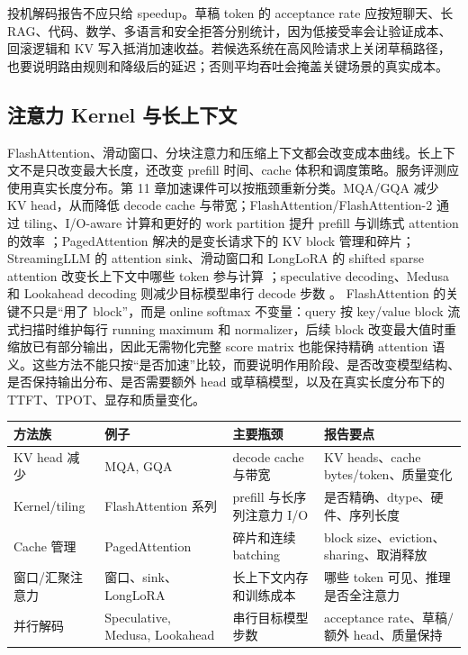 \documentclass[UTF8,zihao=-4,openany]{ctexbook}
\begin{document}
投机解码报告不应只给 speedup。草稿 token 的 acceptance rate 应按短聊天、长 RAG、代码、数学、多语言和安全拒答分别统计，因为低接受率会让验证成本、回滚逻辑和 KV 写入抵消加速收益。若候选系统在高风险请求上关闭草稿路径，也要说明路由规则和降级后的延迟；否则平均吞吐会掩盖关键场景的真实成本。

\subsection{注意力 Kernel 与长上下文}
FlashAttention、滑动窗口、分块注意力和压缩上下文都会改变成本曲线。长上下文不是只改变最大长度，还改变 prefill 时间、cache 体积和调度策略。服务评测应使用真实长度分布。第 11 章加速课件可以按瓶颈重新分类。MQA/GQA 减少 KV head，从而降低 decode cache 与带宽；FlashAttention/FlashAttention-2 通过 tiling、I/O-aware 计算和更好的 work partition 提升 prefill 与训练式 attention 的效率 \cite{dao2022flashattention,dao2023flashattention2}；PagedAttention 解决的是变长请求下的 KV block 管理和碎片；StreamingLLM 的 attention sink、滑动窗口和 LongLoRA 的 shifted sparse attention 改变长上下文中哪些 token 参与计算 \cite{xiao2023streamingllm,chen2023longlora}；speculative decoding、Medusa 和 Lookahead decoding 则减少目标模型串行 decode 步数 \cite{leviathan2023fast,cai2024medusa,fu2024lookahead}。 FlashAttention 的关键不只是“用了 block”，而是 online softmax 不变量：query 按 key/value block 流式扫描时维护每行 running maximum 和 normalizer，后续 block 改变最大值时重缩放已有部分输出，因此无需物化完整 score matrix 也能保持精确 attention 语义。这些方法不能只按“是否加速”比较，而要说明作用阶段、是否改变模型结构、是否保持输出分布、是否需要额外 head 或草稿模型，以及在真实长度分布下的 TTFT、TPOT、显存和质量变化。

\begin{center}
\begin{tabular}{@{}p{}p{}p{}p{}@{}}
\toprule
方法族 & 例子 & 主要瓶颈 & 报告要点 \\
\midrule
KV head 减少 & MQA, GQA & decode cache 与带宽 & KV heads、cache bytes/token、质量变化 \\
Kernel/tiling & FlashAttention 系列 & prefill 与长序列注意力 I/O & 是否精确、dtype、硬件、序列长度 \\
Cache 管理 & PagedAttention & 碎片和连续 batching & block size、eviction、sharing、取消释放 \\
窗口/汇聚注意力 & 窗口、sink、LongLoRA & 长上下文内存和训练成本 & 哪些 token 可见、推理是否全注意力 \\
并行解码 & Speculative, Medusa, Lookahead & 串行目标模型步数 & acceptance rate、草稿/额外 head、质量保持 \\
\bottomrule
\end{tabular}
\end{center}
\end{document}
